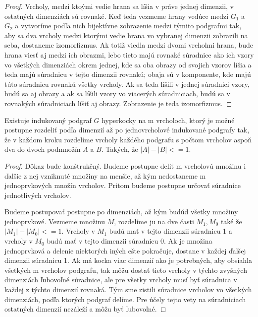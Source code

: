 \begin{proof}
Vrcholy, medzi ktoými vedie hrana sa líšia v práve jednej dimenzii, v
ostatných dimenziách sú rovnaké. Keď teda vezmeme hrany vedúce medzi 
$G_{1}$ a $G_{2}$ a vytvoríme podľa nich bijektívne zobrazenie medzi týmito
podgrafmi tak, aby sa dva vrcholy medzi ktorými vedie hrana vo vybranej
dimenzii zobrazili na seba, dostaneme izomorfizmus. Ak totiž viedla medzi
dvomi vrcholmi hrana, bude hrana viesť aj medzi ich obrazmi, lebo tieto majú
rovnaké súradnice ako ich vzory vo všetkých dimenziách okrem jednej, kde sa
oba obrazy od svojich vzorov líšia a teda majú súradnicu v tejto dimenzii 
rovnakú; obaja sú v komponente, kde majú túto súradnicu rovnakú všetky
vrcholy. Ak sa teda líšili v jednej súradnici vzory, budú sa aj obrazy a ak
sa líšili vzory vo viacerých súradniciach, budú sa v rovnakých súradniciach
líšiť aj obrazy. Zobrazenie  je teda izomorfizmus.
\end{proof}

\begin{veta}
\label{delenie}
Existuje indukovaný podgraf $G$ hyperkocky na m vrcholoch, ktorý je možné 
postupne rozdeliť
podľa dimenzií až po jednovrcholové indukované podgrafy tak, že v každom
kroku rozdelíme vrcholy každého podgrafu s počtom vrcholov aspoň dva do
dvoch podmnožín $A$ a $B$. Takých, že $|A| - |B| <= 1$.
\end{veta}

\begin{proof}
Dôkaz bude konštrukčný. Budeme postupne deliť m vrcholovú množinu i ďalšie z
nej vzniknuté množiny na menšie, až kým nedostaneme m jednoprvkových množín
vrcholov. Pritom budeme postupne určovať súradnice jednotlivých vrcholov.

Budeme postupovať postupne po dimenziách, až kým budúd všetky množiny
jednoprvkové. Vezmeme množinu $M$, rozdelíme ju na dve časti $M_{1}, M_{0}$
také že $|M_{1}| - |M_{0}| <= 1$. Vrcholy v $M_{1}$ budú mať v tejto
dimenzii súradnicu 1 a vrcholy v $M_{0}$ budú mať v tejto dimenzii súradnicu
0. Ak je množina jednoprvková a delenie niektorých iných ešte pokračuje,
dostane v každej ďalšej dimenzii súradnicu 1. Ak má kocka viac dimenzií ako
je potrebných, aby obsiahla všetkých m vrcholov podgrafu, tak môžu dostať
tieto vrcholy v týchto zvyšných dimenziách ľubovoľné súradnice, ale pre
všetky vrcholy musí byť súradnica v každej z týchto dimenzií rovnaká.
Tým sme zistili súradnice vrcholov vo všetkých dimenziách, podľa ktorých
podgraf delíme. Pre účely tejto vety na súradniciach ostatných dimenzií
nezáleží a môžu byť ľubovoľné.
\end{proof}

